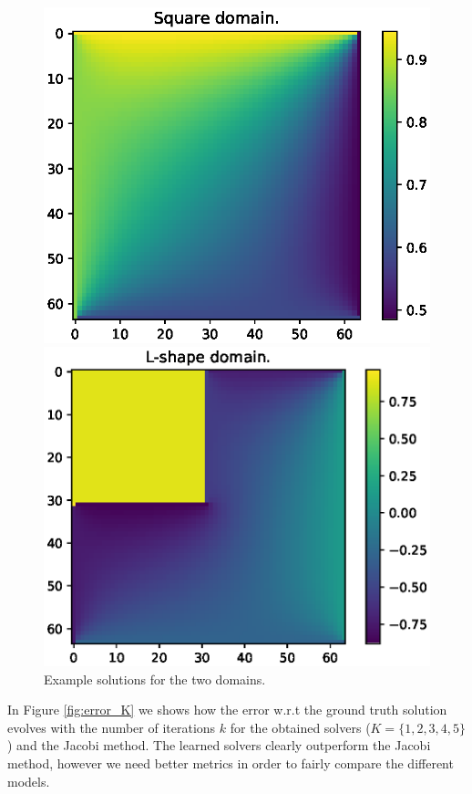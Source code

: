 \begin{figure}[]
    \centering
    \begin{minipage}{.5\textwidth}
        \centering
        \includegraphics[width=0.8\linewidth]{figs/square.eps}
    \end{minipage}%
    \begin{minipage}{0.5\textwidth}
        \centering
        \includegraphics[width=0.8\linewidth]{figs/l_shape.eps}
    \end{minipage}
    \caption{Example solutions for the two domains.}
    \label{fig:example_solutions}
\end{figure}

In Figure \ref{fig:error_K} we shows how the error w.r.t the ground truth solution evolves with the number of iterations $k$ for the obtained solvers ($K=\{1,2,3,4,5\}$) and the Jacobi method. The learned solvers clearly outperform the Jacobi method, however we need better metrics in order to fairly compare the different models.

